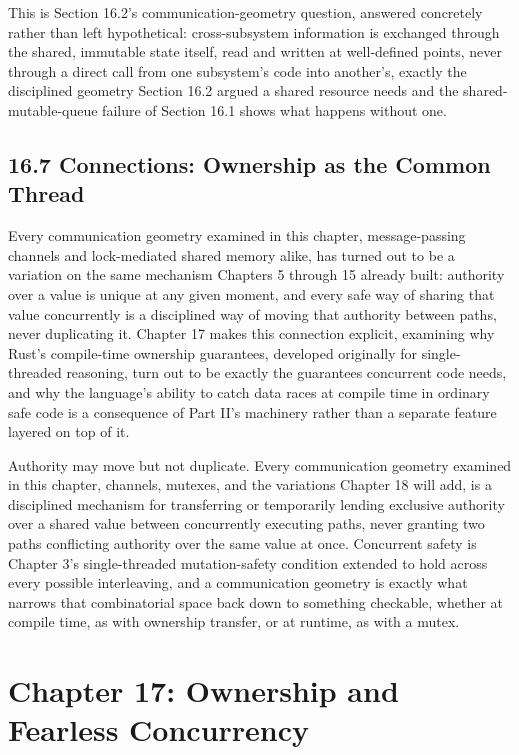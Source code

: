 \documentclass[11pt]{book}
\begin{document}
This is Section 16.2's communication-geometry question, answered concretely rather than left hypothetical: cross-subsystem information is exchanged through the shared, immutable state itself, read and written at well-defined points, never through a direct call from one subsystem's code into another's, exactly the disciplined geometry Section 16.2 argued a shared resource needs and the shared-mutable-queue failure of Section 16.1 shows what happens without one.

\section*{16.7 Connections: Ownership as the Common Thread}

Every communication geometry examined in this chapter, message-passing channels and lock-mediated shared memory alike, has turned out to be a variation on the same mechanism Chapters 5 through 15 already built: authority over a value is unique at any given moment, and every safe way of sharing that value concurrently is a disciplined way of moving that authority between paths, never duplicating it. Chapter 17 makes this connection explicit, examining why Rust's compile-time ownership guarantees, developed originally for single-threaded reasoning, turn out to be exactly the guarantees concurrent code needs, and why the language's ability to catch data races at compile time in ordinary safe code is a consequence of Part II's machinery rather than a separate feature layered on top of it.

\begin{invariantbox}
Authority may move but not duplicate. Every communication geometry examined in this chapter, channels, mutexes, and the variations Chapter 18 will add, is a disciplined mechanism for transferring or temporarily lending exclusive authority over a shared value between concurrently executing paths, never granting two paths conflicting authority over the same value at once. Concurrent safety is Chapter 3's single-threaded mutation-safety condition extended to hold across every possible interleaving, and a communication geometry is exactly what narrows that combinatorial space back down to something checkable, whether at compile time, as with ownership transfer, or at runtime, as with a mutex.
\end{invariantbox}

\clearpage

\chapter*{Chapter 17: Ownership and Fearless Concurrency}
\end{document}
